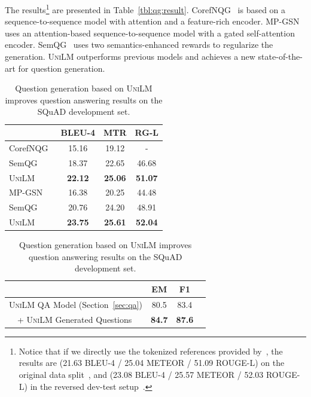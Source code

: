 \documentclass{article}
\newcommand\ours{\textsc{UniLM}}
\begin{document}
The results\footnote{Notice that if we directly use the tokenized references provided by~, the results are (21.63 BLEU-4 / 25.04 METEOR / 51.09 ROUGE-L) on the original data split~\cite{du-qg-2017}, and (23.08 BLEU-4 / 25.57 METEOR / 52.03 ROUGE-L) in the reversed dev-test setup~\cite{zhao-qg-2018}.} are presented in Table~\ref{tbl:qg:result}.
CorefNQG~\cite{du-qg-2018} is based on a sequence-to-sequence model with attention and a feature-rich encoder.
MP-GSN~\cite{zhao-qg-2018} uses an attention-based sequence-to-sequence model with a gated self-attention encoder.
SemQG~\cite{zhang-qg-2019} uses two semantics-enhanced rewards to regularize the generation.
\ours{} outperforms previous models and achieves a new state-of-the-art for question generation. %

\begin{table}[t]
\centering
\small
\begin{minipage}{2.8in}
\centering
\begin{tabular}{l c c c}
\toprule
& BLEU-4       & MTR        & RG-L
\\ \midrule
CorefNQG~\cite{du-qg-2018} & 15.16           & 19.12   & - \\
SemQG~\cite{zhang-qg-2019} & 18.37           & 22.65   & 46.68 \\
\ours & \textbf{22.12}  & \textbf{25.06} & \textbf{51.07} \\ \midrule
MP-GSN~\cite{zhao-qg-2018}   & 16.38 & 20.25           &   44.48   \\
SemQG~\cite{zhang-qg-2019} & 20.76           & 24.20   & 48.91 \\
\ours & \textbf{23.75}  & \textbf{25.61} & \textbf{52.04} \\
\bottomrule
\end{tabular}
\caption{Question generation results on SQuAD. MTR is short for METEOR, and RG for ROUGE. Results in the groups use different data splits.}
\normalsize
\label{tbl:qg:result}
\end{minipage}
\hfill
\begin{minipage}{2.6in}
\centering
\begin{tabular}{l c c c}
\toprule
                & EM       & F1  
                \\ \midrule
\ours{} QA Model (Section~\ref{sec:qa})   & 80.5 & 83.4  \\
~~+ \ours{} Generated Questions   & \textbf{84.7} & \textbf{87.6}       \\
\bottomrule
\end{tabular}
\normalsize
\caption{Question generation based on \ours{} improves question answering results on the SQuAD development set.}
\label{tbl:squad:qg4qa:result}
\end{minipage}
\end{table}
\end{document}
